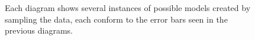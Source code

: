 \documentclass[10pt]{article}
\begin{document}
\begin{itemize}
\begin{figure}[htb]
\clearpage
\begin{center}


\caption{Each diagram shows several instances of possible models created by sampling the data, each conform to the error bars seen in the previous diagrams.}
\end{center}
\end{figure}


\end{itemize}
\end{document}
